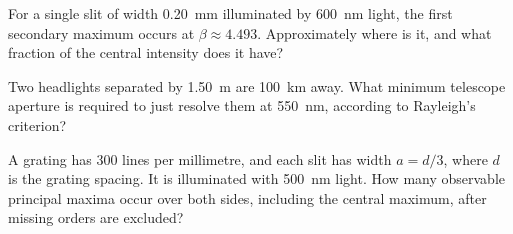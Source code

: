 \documentclass[10pt,a4paper]{physicsquiz}
\begin{document}
\begin{quizquestions}[2]
  \item For a single slit of width \SI{0.20}{mm} illuminated by \SI{600}{nm} light, the first secondary maximum occurs at \(\beta\approx4.493\). Approximately where is it, and what fraction of the central intensity does it have?
  \item Two headlights separated by \SI{1.50}{m} are \SI{100}{km} away. What minimum telescope aperture is required to just resolve them at \SI{550}{nm}, according to Rayleigh's criterion?
  \item A grating has \(300\) lines per millimetre, and each slit has width \(a=d/3\), where \(d\) is the grating spacing. It is illuminated with \SI{500}{nm} light. How many observable principal maxima occur over both sides, including the central maximum, after missing orders are excluded?
\end{quizquestions}
\clearpage
\end{document}
